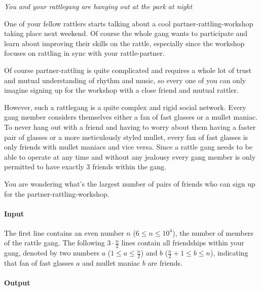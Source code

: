 



\makeheader

\textmusicalnote
\emph{You and your rattlegang are hanging out at the park at night}
\textmusicalnote

One of your fellow rattlers starts talking about a cool partner-rattling-workshop taking place next weekend.
Of course the whole gang wants to participate and learn about improving their skills on the rattle,
especially since the workshop focuses on rattling in sync with your rattle-partner. 

Of course partner-rattling is quite complicated and requires a whole lot of trust and mutual understanding of rhythm and music,
so every one of you can only imagine signing up for the workshop with a close friend and mutual rattler. 

However, such a rattlegang is a quite complex and rigid social network.
Every gang member considers themselves either a fan of fast glasses or a mullet maniac.
To never hang out with a friend and having to worry about them having a faster pair of glasses or a more meticulously styled mullet,
every fan of fast glasses is only friends with mullet maniacs and vice versa.
Since a rattle gang needs to be able to operate at any time and without any jealousy every gang member is only permitted to have exactly 3 friends within the gang.

You are wondering what's the largest number of pairs of friends who can sign up for the partner-rattling-workshop. 

\paragraph*{Input}

The first line contains an even number $n$ ($6 \leq n \leq 10^4$), the number of members of the rattle gang.
The following $3 \cdot \frac{n}{2}$ lines contain all friendships within your gang, denoted by two numbers $a$ ($1 \leq a \leq \frac{n}{2}$) and $b$ ($\frac{n}{2} + 1 \leq b \leq n$), indicating that fan of fast glasses $a$ and mullet maniac $b$ are friends.

\paragraph*{Output}

